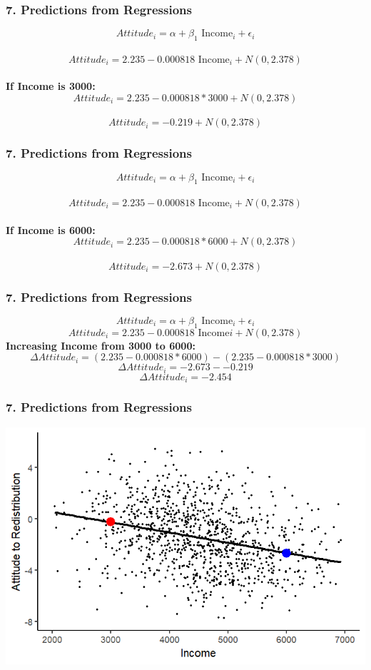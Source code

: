 \documentclass[xcolor=x11names,compress]{beamer}\usepackage[]{graphicx}\usepackage[]{color}
\makeatletter
\def\maxwidth{ %
  \ifdim\Gin@nat@width>\linewidth
    \linewidth
  \else
    \Gin@nat@width
  \fi
}
\newenvironment{knitrout}{}{} %
\renewcommand{\(}{\begin{columns}}
\renewcommand{\)}{\end{columns}}
\newcommand{\<}[1]{\begin{column}{#1}}
\renewcommand{\>}{\end{column}}
\makeatother
\begin{document}
\begin{frame}
\frametitle{7. Predictions from Regressions}
$$Attitude_i = \alpha + \beta_1 \text{ Income}_i + \epsilon_i$$ \\
\pause
$$Attitude_i = 2.235 - 0.000818 \text{ Income}_i + N(0,2.378)$$ \\
\pause
\textbf{If Income is 3000:}  \\
$$Attitude_i = 2.235-0.000818*3000 + N(0,2.378)$$ \\
$$Attitude_i = -0.219 + N(0,2.378)$$
\end{frame}

\begin{frame}
\frametitle{7. Predictions from Regressions}
$$Attitude_i = \alpha + \beta_1 \text{ Income}_i + \epsilon_i$$ \\
$$Attitude_i = 2.235 - 0.000818 \text{ Income}_i + N(0,2.378)$$ \\
\textbf{If Income is 6000:}  \\
$$Attitude_i = 2.235-0.000818*6000 + N(0,2.378)$$ \\
$$Attitude_i = -2.673 + N(0,2.378)$$
\end{frame}

\begin{frame}
\frametitle{7. Predictions from Regressions}
$$Attitude_i = \alpha + \beta_1 \text{ Income}_i + \epsilon_i$$
$$Attitude_i = 2.235 - 0.000818 \text{ Income}i + N(0,2.378)$$
\textbf{Increasing Income from 3000 to 6000:} \\
$$\Delta Attitude_i = (2.235-0.000818*6000) - (2.235-0.000818*3000)$$
$$\Delta Attitude_i = -2.673 - -0.219$$
$$\Delta Attitude_i = -2.454$$
\end{frame}

\begin{frame}
\frametitle{7. Predictions from Regressions}
\begin{knitrout}
\color{fgcolor}
\includegraphics[width=\maxwidth]{figure/predictions1-1} 

\end{knitrout}
\end{frame}
\end{document}
